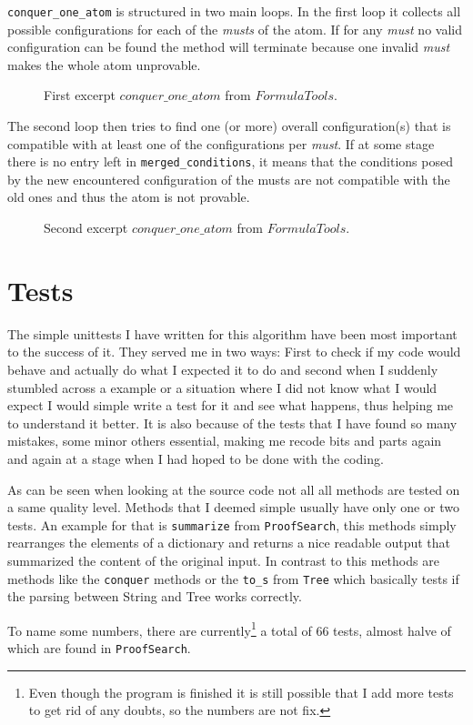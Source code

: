 \texttt{conquer\_one\_atom} is structured in two main loops. In the first loop it collects all possible configurations for each of the \emph{musts} of the atom. If for any \emph{must} no valid configuration can be found the method will terminate because one invalid \emph{must} makes the whole atom unprovable.

\begin{figure}[H]
	\caption{First excerpt $conquer\_one\_ atom$ from $FormulaTools$.}
	\vspace{-10pt}
	
	\vspace{-10pt}
\end{figure}

The second loop then tries to find one (or more) overall configuration(s) that is compatible with at least one of the configurations per \emph{must}. If at some stage there is no entry left in \texttt{merged\_conditions}, it means that the conditions posed by the new encountered configuration of the musts are not compatible with the old ones and thus the atom is not provable.

\begin{figure}[H]
	\caption{Second excerpt $conquer\_one\_ atom$ from $FormulaTools$.}
	\vspace{-10pt}
	
	\vspace{-10pt}
\end{figure}

\bigskip


\section{Tests}
The simple unittests I have written for this algorithm have been most important to the success of it. They served me in two ways: First to check if my code would behave and actually do what I expected it to do and second when I suddenly stumbled across a example or a situation where I did not know what I would expect I would simple write a test for it and see what happens, thus helping me to understand it better.
It is also because of the tests that I have found so many mistakes, some minor others essential, making me recode bits and parts again and again at a stage when I had hoped to be done with the coding.

As can be seen when looking at the source code not all all methods are tested on a same quality level. Methods that I deemed simple usually have only one or two tests. An example for that is \texttt{summarize} from \texttt{ProofSearch}, this methods simply rearranges the elements of a dictionary and returns a nice readable output that summarized the content of the original input. In contrast to this methods are methods like the \texttt{conquer} methods or the \texttt{to\_s} from \texttt{Tree} which basically tests if the parsing between String and Tree works correctly.

To name some numbers, there are currently\footnote{Even though the program is finished it is still possible that I add more tests to get rid of any doubts, so the numbers are not fix.} a total of 66 tests, almost halve of which are found in \texttt{ProofSearch}. 